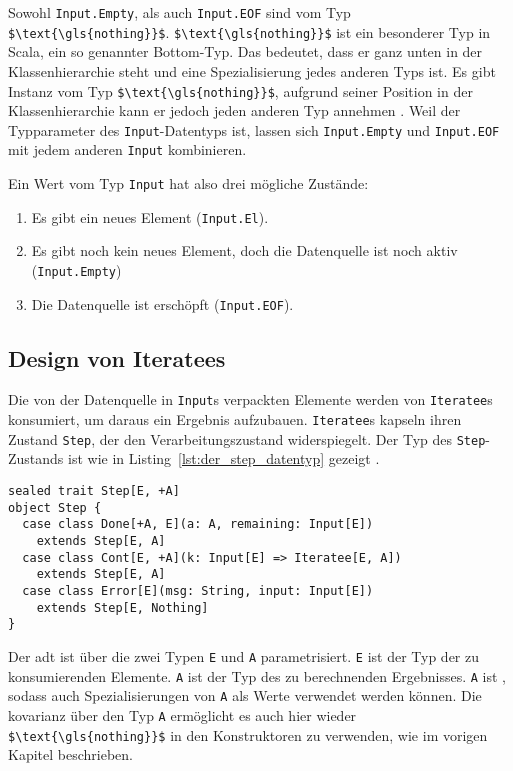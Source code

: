 Sowohl \lstinline|Input.Empty|, als auch \lstinline|Input.EOF| sind vom Typ \lstinline[mathescape]|$\text{\gls{nothing}}$|.
\lstinline[mathescape]|$\text{\gls{nothing}}$| ist ein besonderer Typ in Scala, ein so genannter Bottom-Typ.
Das bedeutet, dass er ganz unten in der Klassenhierarchie steht und eine Spezialisierung jedes anderen Typs ist.
Es gibt Instanz vom Typ \lstinline[mathescape]|$\text{\gls{nothing}}$|, aufgrund seiner Position in der Klassenhierarchie kann er jedoch jeden anderen Typ annehmen \cite[vgl.][S.~256--257]{programming_in_scala}.
Weil der Typparameter des \lstinline|Input|-Datentyps  ist, lassen sich \lstinline|Input.Empty| und \lstinline|Input.EOF| mit jedem anderen \lstinline|Input| kombinieren.

Ein Wert vom Typ \lstinline|Input| hat also drei mögliche Zustände:
\begin{enumerate}
  \item Es gibt ein neues Element (\lstinline|Input.El|).
  \item Es gibt noch kein neues Element, doch die Datenquelle ist noch aktiv (\lstinline|Input.Empty|)
  \item Die Datenquelle ist erschöpft (\lstinline|Input.EOF|).
\end{enumerate}



\subsection{Design von Iteratees} %
\label{sub:design_iteratees}

Die von der Datenquelle in \lstinline|Input|s verpackten Elemente werden von \lstinline|Iteratee|s konsumiert, um daraus ein Ergebnis aufzubauen.
\lstinline|Iteratee|s kapseln ihren Zustand \lstinline|Step|, der den Verarbeitungszustand widerspiegelt.
Der Typ des \lstinline|Step|-Zustands ist wie in Listing~\ref{lst:der_step_datentyp} gezeigt \cite[vgl.][Z.~256]{play_iteratee_source_code}.
\begin{lstlisting}[caption=Der Step-Datentyp, label=lst:der_step_datentyp]
sealed trait Step[E, +A]
object Step {
  case class Done[+A, E](a: A, remaining: Input[E])
    extends Step[E, A]
  case class Cont[E, +A](k: Input[E] => Iteratee[E, A])
    extends Step[E, A]
  case class Error[E](msg: String, input: Input[E])
    extends Step[E, Nothing]
}
\end{lstlisting}

Der \gls{adt} ist über die zwei Typen \lstinline|E| und \lstinline|A| parametrisiert.
\lstinline|E| ist der Typ der zu konsumierenden Elemente.
\lstinline|A| ist der Typ des zu berechnenden Ergebnisses.
\lstinline|A| ist , sodass auch Spezialisierungen von \lstinline|A| als Werte verwendet werden können.
Die \gls{kovarianz} über den Typ \lstinline|A| ermöglicht es auch hier wieder \lstinline[mathescape]|$\text{\gls{nothing}}$| in den Konstruktoren zu verwenden, wie im vorigen Kapitel beschrieben.

